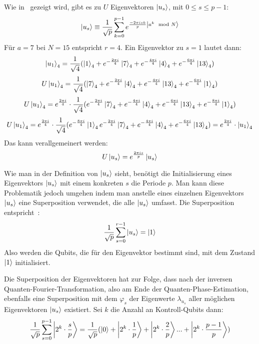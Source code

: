 Wie in~\cite*{nielsen_chuang_2010} gezeigt wird, gibt es zu \(U\) Eigenvektoren \(\ket{u_s}\), 
mit \(0 \leq s \leq p-1\): 
\[\ket{u_s} \equiv
\frac{1}{\sqrt{p}}
\sum_{k=0}^{p-1} e^{\frac{-2 \pi i s k}{p}\ket{a^k \mod N}} %
\]
Für \(a=7\) bei \(N=15\) entspricht \(r=4\).
Ein Eigenvektor zu \(s=1\) lautet dann:
\[
    \ket{u_1}_4 =
    \frac{1}{\sqrt{4}}(
        \ket{1}_4 + 
        e^{-\frac{2 \pi i}{4}}\ket{7}_4 + 
        e^{-\frac{4 \pi i}{4}}\ket{4}_4+ 
        e^{-\frac{6 \pi i}{4}}\ket{13}_4
    )
    \]
\[
    U\ket{u_1}_4 =
    \frac{1}{\sqrt{4}}(
        \ket{7}_4 + 
        e^{-\frac{2 \pi i}{4}}\ket{4}_4 + 
        e^{-\frac{4 \pi i}{4}}\ket{13}_4+ 
        e^{-\frac{6 \pi i}{4}}\ket{1}_4
    )
    \]
\[
    U\ket{u_1}_4 =
    e^{\frac{2 \pi i}{4}}
    \cdot
    \frac{1}{\sqrt{4}}(
        e^{-\frac{2 \pi i}{4}}\ket{7}_4 + 
        e^{-\frac{4 \pi i}{4}}\ket{4}_4 + 
        e^{-\frac{6 \pi i}{4}}\ket{13}_4+ 
        e^{-\frac{8 \pi i}{4}}\ket{1}_4
    )
    \]
\[
    U\ket{u_1}_4 =
    e^{\frac{2 \pi i}{4}}
    \cdot
    \frac{1}{\sqrt{4}}(
        e^{-\frac{8 \pi i}{4}}\ket{1}_4
        e^{-\frac{2 \pi i}{4}}\ket{7}_4 + 
        e^{-\frac{4 \pi i}{4}}\ket{4}_4 + 
        e^{-\frac{6 \pi i}{4}}\ket{13}_4 )
    =
    e^{\frac{2 \pi i}{4}} \cdot
    \ket{u_1}_4
    \]
Das kann verallgemeinert werden:
\[U\ket{u_s} = e^{\frac{2 \pi i s}{p}}\ket{u_s}\]

Wie man in der Definition von \(\ket{u_s}\) %
sieht, 
benötigt die Initialisierung eines Eigenvektors \(\ket{u_s}\) mit einem konkreten \(s\) die Periode \(p\).
Man kann diese Problematik jedoch umgehen indem man anstelle eines einzelnen Eigenvektors \(\ket{u_s}\)
eine Superposition verwendet, die alle \(\ket{u_s}\) umfasst.
Die Superposition entspricht~\cite*{nielsen_chuang_2010}:
\[\frac{1}{\sqrt{p}} \sum_{s=0}^{r-1}\ket{u_s} = \ket{1}\] 
Also werden die Qubits, die für den Eigenvektor bestimmt sind, mit dem Zustand \(\ket{1}\) initialisiert.

Die Superposition der Eigenvektoren hat zur Folge, 
dass nach der inversen Quanten-Fourier-Transformation, also am Ende der Quanten-Phase-Estimation,
ebenfalls eine Superposition mit dem \(\varphi_s\) der Eigenwerte \(\lambda_{u_s}\) aller möglichen Eigenvektoren \(\ket{u_s}\) existiert.
Sei \(k\) die Anzahl an Kontroll-Qubits dann:
\[
    \frac{1}{\sqrt{p}} \sum_{s=0}^{p-1}\ket{2^k \cdot \frac{s}{p}}  = 
    \frac{1}{\sqrt{p}} (\ket{0} + \ket{2^k \cdot \frac{1}{p}} + \ket{2^k \cdot \frac{2}{p}} ... + \ket{2^k \cdot \frac{p-1}{p}})
    \]


